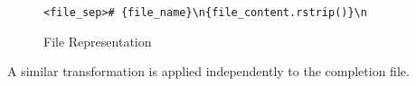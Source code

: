 \begin{figure}[H]
    \centering
    \begin{tcolorbox}[colback=white, colframe=black, boxrule=0.5pt, width=0.8\linewidth, sharp corners]
        \centering
        \texttt{<file\_sep>\# \{file\_name\}\textbackslash n\{file\_content.rstrip()\}\textbackslash n} \\
    \end{tcolorbox}
    \caption{File Representation}
    \label{fig:file_representation}
\end{figure}

A similar transformation is applied independently to the completion file.
